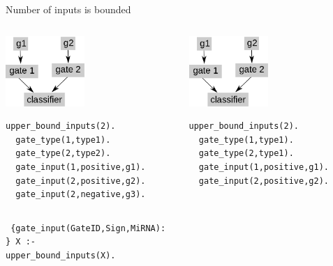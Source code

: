 \documentclass[10pt,dvipsnames]{beamer}
\begin{document}
\begin{frame}[fragile]{Number of inputs is bounded}
 \begin{columns}  
 \begin{column}{0.5\textwidth}
 \begin{center}\includegraphics[width=3cm]{constraints_04.png}\end{center}
 \color{my_example_color}
  \begin{Verbatim}[fontsize=\small]
  upper_bound_inputs(2).
  gate_type(1,type1).
  gate_type(2,type2).
  gate_input(1,positive,g1).
  gate_input(2,positive,g2).
  gate_input(2,negative,g3).
 \end{Verbatim}
 \end{column}
 \begin{column}{0.5\textwidth}
 \begin{center}\includegraphics[width=3cm]{constraints_05.png}\end{center}
 \color{my_example_color}
  \begin{Verbatim}[fontsize=\small]
  upper_bound_inputs(2).
  gate_type(1,type1).
  gate_type(2,type1).
  gate_input(1,positive,g1).
  gate_input(2,positive,g2).
 \end{Verbatim}
 \end{column}
 \end{columns}
 \vspace{1cm}
 \texttt{
  \{gate\_input(GateID,Sign,MiRNA):\\
   \} X :-\\
   \quad upper\_bound\_inputs(X).
 }
\end{frame}
\end{document}

